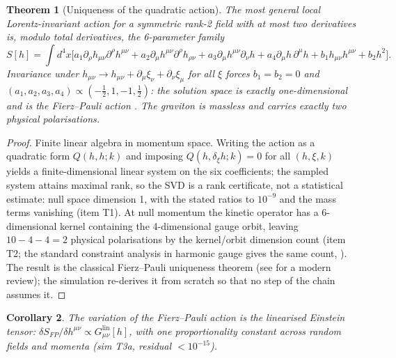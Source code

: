 \documentclass[12pt]{article}
\newtheorem{theorem}{Theorem}
\newtheorem{corollary}[theorem]{Corollary}
\theoremstyle{definition}
\theoremstyle{remark}
\begin{document}
\begin{theorem}[Uniqueness of the quadratic action]\label{thm:unique}
The most general local Lorentz-invariant action for a symmetric rank-2 field with at most two derivatives is, modulo total derivatives, the 6-parameter family
\begin{equation}
S[h] = \!\int\! d^4x\Big[a_1 \partial_\rho h_{\mu\nu}\partial^\rho h^{\mu\nu} + a_2 \partial_\mu h^{\mu\nu}\partial^\rho h_{\rho\nu} + a_3 \partial_\mu h^{\mu\nu}\partial_\nu h + a_4 \partial_\mu h\,\partial^\mu h + b_1 h_{\mu\nu}h^{\mu\nu} + b_2 h^2\Big].
\end{equation}
Invariance under $h_{\mu\nu} \to h_{\mu\nu} + \partial_\mu\xi_\nu + \partial_\nu\xi_\mu$ for all $\xi$ forces $b_1 = b_2 = 0$ and $(a_1, a_2, a_3, a_4) \propto (-\tfrac12, 1, -1, \tfrac12)$: the solution space is exactly one-dimensional and is the Fierz--Pauli action \citep{FierzPauli1939}. The graviton is massless and carries exactly two physical polarisations.
\end{theorem}

\begin{proof}
Finite linear algebra in momentum space. Writing the action as a quadratic form $Q(h, h; k)$ and imposing $Q(h, \delta_\xi h; k) = 0$ for all $(h, \xi, k)$ yields a finite-dimensional linear system on the six coefficients; the sampled system attains maximal rank, so the SVD is a rank certificate, not a statistical estimate: null space dimension 1, with the stated ratios to $10^{-9}$ and the mass terms vanishing (item T1). At null momentum the kinetic operator has a 6-dimensional kernel containing the 4-dimensional gauge orbit, leaving $10 - 4 - 4 = 2$ physical polarisations by the kernel/orbit dimension count (item T2; the standard constraint analysis in harmonic gauge gives the same count, \citealp{Hinterbichler2012}). The result is the classical Fierz--Pauli uniqueness theorem (see \citealp{Hinterbichler2012} for a modern review); the simulation re-derives it from scratch so that no step of the chain assumes it.
\end{proof}

\begin{corollary}\label{cor:einstein-tensor}
The variation of the Fierz--Pauli action is the linearised Einstein tensor: $\delta S_{FP}/\delta h^{\mu\nu} \propto G^{\mathrm{lin}}_{\mu\nu}[h]$, with one proportionality constant across random fields and momenta (sim T3a, residual $< 10^{-15}$).
\end{corollary}
\end{document}
